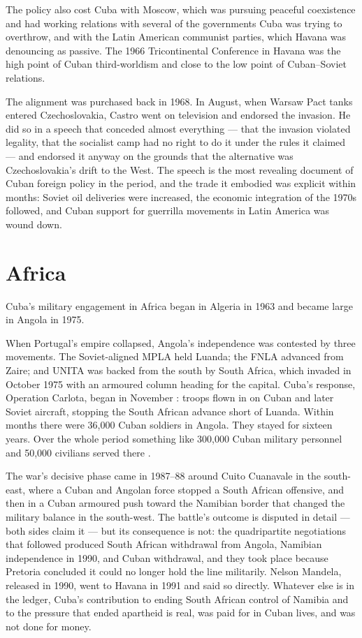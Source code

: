 The policy also cost Cuba with Moscow, which was pursuing peaceful coexistence
and had working relations with several of the governments Cuba was trying to
overthrow, and with the Latin American communist parties, which Havana was
denouncing as passive. The 1966 Tricontinental Conference in Havana was the
high point of Cuban third-worldism and close to the low point of Cuban--Soviet
relations.

The alignment was purchased back in 1968. In August, when Warsaw Pact tanks
entered Czechoslovakia, Castro went on television and endorsed the invasion. He
did so in a speech that conceded almost everything --- that the invasion
violated legality, that the socialist camp had no right to do it under the
rules it claimed --- and endorsed it anyway on the grounds that the alternative
was Czechoslovakia's drift to the West. The speech is the most revealing
document of Cuban foreign policy in the period, and the trade it embodied was
explicit within months: Soviet oil deliveries were increased, the economic
integration of the 1970s followed, and Cuban support for guerrilla movements in
Latin America was wound down.

\section{Africa}

Cuba's military engagement in Africa began in Algeria in 1963 and became large
in Angola in 1975.

When Portugal's empire collapsed, Angola's independence was contested by three
movements. The Soviet-aligned MPLA held Luanda; the FNLA advanced from Zaire;
and UNITA was backed from the south by South Africa, which invaded in October
1975 with an armoured column heading for the capital. Cuba's response,
Operation Carlota, began in November \citep{gleijeses2002}: troops flown in on Cuban and later Soviet
aircraft, stopping the South African advance short of Luanda. Within months
there were 36,000 Cuban soldiers in Angola. They stayed for sixteen years. Over
the whole period something like 300,000 Cuban military personnel and 50,000
civilians served there \citep{gleijeses2013}.\unv{}

The war's decisive phase came in 1987--88 around Cuito Cuanavale in the
south-east, where a Cuban and Angolan force stopped a South African offensive,
and then in a Cuban armoured push toward the Namibian border that changed the
military balance in the south-west. The battle's outcome is disputed in detail
--- both sides claim it --- but its consequence is not: the quadripartite
negotiations that followed produced South African withdrawal from Angola,
Namibian independence in 1990, and Cuban withdrawal, and they took place
because Pretoria concluded it could no longer hold the line militarily. Nelson
Mandela, released in 1990, went to Havana in 1991 and said so directly. Whatever
else is in the ledger, Cuba's contribution to ending South African control of
Namibia and to the pressure that ended apartheid is real, was paid for in Cuban
lives, and was not done for money.

